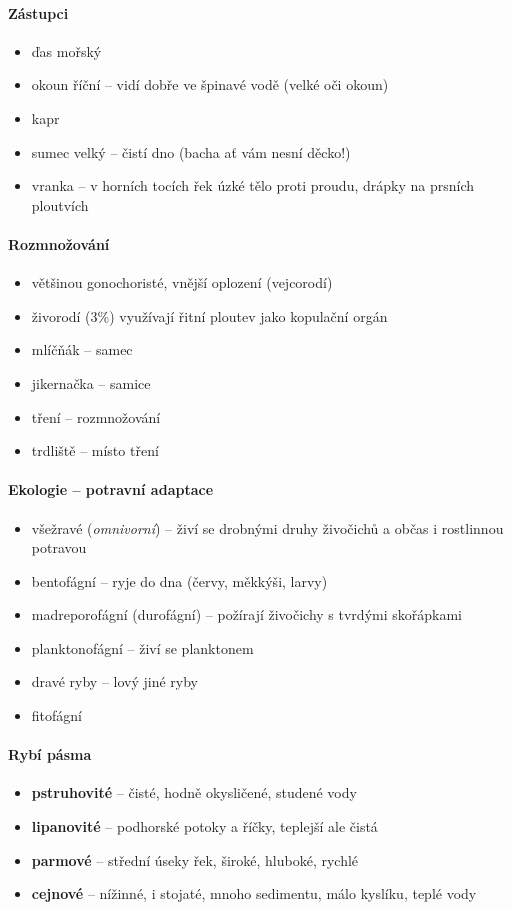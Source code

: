 \paragraph{Zástupci}
\begin{itemize}
\item ďas mořský
\item okoun říční -- vidí dobře ve špinavé vodě (velké oči \ra okoun)
\item kapr
\item sumec velký -- čistí dno (bacha ať vám nesní děcko!)
\item vranka -- v horních tocích řek \ra úzké tělo proti proudu, drápky na prsních ploutvích
\end{itemize}


\paragraph{Rozmnožování}
\begin{itemize}
\item většinou gonochoristé, vnější oplození (vejcorodí)
\item živorodí (3\%) využívají řitní ploutev jako kopulační orgán
\item mlíčňák -- samec
\item jikernačka -- samice
\item tření -- rozmnožování
\item trdliště -- místo tření
\end{itemize}

\paragraph{Ekologie -- potravní adaptace}
\begin{itemize}
\item všežravé (\textit{omnivorní}) -- živí se drobnými druhy živočichů a občas i rostlinnou potravou
\item bentofágní -- ryje do dna (červy, měkkýši, larvy)
\item madreporofágní (durofágní) -- požírají živočichy s tvrdými skořápkami
\item planktonofágní -- živí se planktonem
\item dravé ryby -- lový jiné ryby
\item fitofágní
\end{itemize}

\paragraph{Rybí pásma}
\begin{itemize}
\item \textbf{pstruhovité} -- čisté, hodně okysličené, studené vody
\item \textbf{lipanovité} -- podhorské potoky a říčky, teplejší ale čistá
\item \textbf{parmové} -- střední úseky řek, široké, hluboké, rychlé
\item \textbf{cejnové} -- nížinné, i stojaté, mnoho sedimentu, málo kyslíku, teplé vody
\end{itemize}

